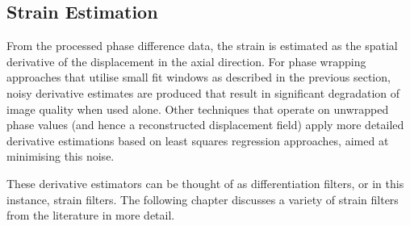 \subsection{Strain Estimation}

From the processed phase difference data, the strain is estimated as the spatial derivative of the displacement in the axial direction. For phase wrapping approaches that utilise small fit windows as described in the previous section, noisy derivative estimates are produced that result in significant degradation of image quality when used alone. Other techniques that operate on unwrapped phase values (and hence a reconstructed displacement field) apply more detailed derivative estimations based on least squares regression approaches, aimed at minimising this noise.

These derivative estimators can be thought of as differentiation filters, or in this instance, strain filters. The following chapter discusses a variety of strain filters from the literature in more detail.

